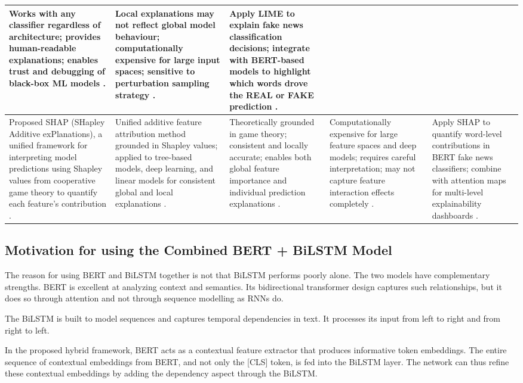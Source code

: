 \documentclass[runningheads]{llncs}
\begin{document}
\begin{longtable}{|p{}|p{}|p{}|p{}|p{}|}
Works with any classifier regardless of architecture; provides human-readable explanations; enables trust and debugging of black-box ML models \cite{Ribeiro2016LIME}. &
Local explanations may not reflect global model behaviour; computationally expensive for large input spaces; sensitive to perturbation sampling strategy \cite{Ribeiro2016LIME}. &
Apply LIME to explain fake news classification decisions; integrate with BERT-based models to highlight which words drove the REAL or FAKE prediction \cite{Ribeiro2016LIME}. \\ \hline
Proposed SHAP (SHapley Additive exPlanations), a unified framework for interpreting model predictions using Shapley values from cooperative game theory to quantify each feature's contribution \cite{Lundberg2017SHAP}. &
Unified additive feature attribution method grounded in Shapley values; applied to tree-based models, deep learning, and linear models for consistent global and local explanations \cite{Lundberg2017SHAP}. &
Theoretically grounded in game theory; consistent and locally accurate; enables both global feature importance and individual prediction explanations \cite{Lundberg2017SHAP}. &
Computationally expensive for large feature spaces and deep models; requires careful interpretation; may not capture feature interaction effects completely \cite{Lundberg2017SHAP}. &
Apply SHAP to quantify word-level contributions in BERT fake news classifiers; combine with attention maps for multi-level explainability dashboards \cite{Lundberg2017SHAP}. \\ \hline
\end{longtable}

\subsection{Motivation for using the Combined BERT + BiLSTM Model}

The reason for using BERT and BiLSTM together is not that BiLSTM performs poorly alone. The two models have complementary strengths. BERT is excellent at analyzing context and semantics. Its bidirectional transformer design captures such relationships, but it does so through attention and not through sequence modelling as RNNs do.

The BiLSTM is built to model sequences and captures temporal dependencies in text. It processes its input from left to right and from right to left.

In the proposed hybrid framework, BERT acts as a contextual feature extractor that produces informative token embeddings. The entire sequence of contextual embeddings from BERT, and not only the [CLS] token, is fed into the BiLSTM layer. The network can thus refine these contextual embeddings by adding the dependency aspect through the BiLSTM.
\end{document}
